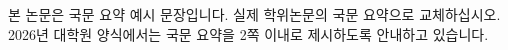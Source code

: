 \begin{yonseikoreanabstract}
본 논문은 국문 요약 예시 문장입니다. 실제 학위논문의 국문 요약으로 교체하십시오. 2026년 대학원 양식에서는 국문 요약을 2쪽 이내로 제시하도록 안내하고 있습니다.

\end{yonseikoreanabstract}
